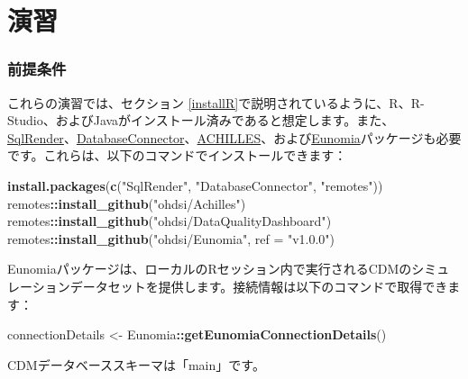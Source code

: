 \documentclass[
  11pt]{book}
\newenvironment{Shaded}{\begin{snugshade}}{\end{snugshade}}
\newcommand{\AttributeTok}[1]{\textcolor[rgb]{0.13,0.29,0.53}{#1}}
\newcommand{\FunctionTok}[1]{\textcolor[rgb]{0.13,0.29,0.53}{\textbf{#1}}}
\newcommand{\NormalTok}[1]{#1}
\newcommand{\OtherTok}[1]{\textcolor[rgb]{0.56,0.35,0.01}{#1}}
\newcommand{\SpecialCharTok}[1]{\textcolor[rgb]{0.81,0.36,0.00}{\textbf{#1}}}
\newcommand{\StringTok}[1]{\textcolor[rgb]{0.31,0.60,0.02}{#1}}
\theoremstyle{definition}
\theoremstyle{definition}
\theoremstyle{definition}
\theoremstyle{definition}
\theoremstyle{remark}
\begin{document}
\section{演習}\label{ux6f14ux7fd2-9}

\subsubsection*{前提条件}\label{ux524dux63d0ux6761ux4ef6-9}

これらの演習では、セクション \ref{installR}で説明されているように、R、R-Studio、およびJavaがインストール済みであると想定します。また、\href{https://ohdsi.github.io/SqlRender/}{SqlRender}、\href{https://ohdsi.github.io/DatabaseConnector/}{DatabaseConnector}、\href{https://github.com/OHDSI/Achilles}{ACHILLES}、および\href{https://ohdsi.github.io/Eunomia/}{Eunomia}パッケージも必要です。これらは、以下のコマンドでインストールできます：

\begin{Shaded}
\begin{Highlighting}[]
\FunctionTok{install.packages}\NormalTok{(}\FunctionTok{c}\NormalTok{(}\StringTok{"SqlRender"}\NormalTok{, }\StringTok{"DatabaseConnector"}\NormalTok{, }\StringTok{"remotes"}\NormalTok{))}
\NormalTok{remotes}\SpecialCharTok{::}\FunctionTok{install\_github}\NormalTok{(}\StringTok{"ohdsi/Achilles"}\NormalTok{)}
\NormalTok{remotes}\SpecialCharTok{::}\FunctionTok{install\_github}\NormalTok{(}\StringTok{"ohdsi/DataQualityDashboard"}\NormalTok{)}
\NormalTok{remotes}\SpecialCharTok{::}\FunctionTok{install\_github}\NormalTok{(}\StringTok{"ohdsi/Eunomia"}\NormalTok{, }\AttributeTok{ref =} \StringTok{"v1.0.0"}\NormalTok{)}
\end{Highlighting}
\end{Shaded}

Eunomiaパッケージは、ローカルのRセッション内で実行されるCDMのシミュレーションデータセットを提供します。接続情報は以下のコマンドで取得できます：

\begin{Shaded}
\begin{Highlighting}[]
\NormalTok{connectionDetails }\OtherTok{\textless{}{-}}\NormalTok{ Eunomia}\SpecialCharTok{::}\FunctionTok{getEunomiaConnectionDetails}\NormalTok{()}
\end{Highlighting}
\end{Shaded}

CDMデータベーススキーマは「main」です。
\end{document}
